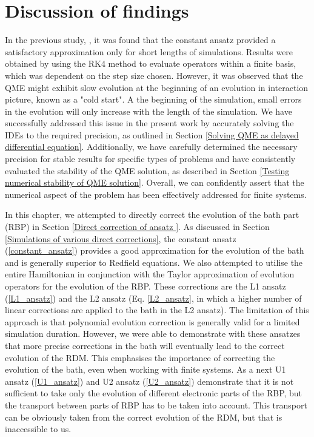 \section{Discussion of findings}
In the previous study, \cite{herman_elektron-fononova_2020}, it was found that the constant ansatz provided a satisfactory approximation only for short lengths of simulations. Results were obtained by using the RK4 method to evaluate operators within a finite basis, which was dependent on the step size chosen. However, it was observed that the QME might exhibit slow evolution at the beginning of an evolution in interaction picture, known as a "cold start". A the beginning of the simulation, small errors in the evolution will only increase with the length of the simulation. We have successfully addressed this issue in the present work by accurately solving the IDEs to the required precision, as outlined in Section \ref{Solving QME as delayed differential equation}. Additionally, we have carefully determined the necessary precision for stable results for specific types of problems and have consistently evaluated the stability of the QME solution, as described in Section \ref{Testing numerical stability of QME solution}. Overall, we can confidently assert that the numerical aspect of the problem has been effectively addressed for finite systems.
 
In this chapter, we attempted to directly correct the evolution of the bath part (RBP) in Section \ref{Direct correction of ansatz }. As discussed in Section \ref{Simulations of various direct corrections}, the constant ansatz (\ref{constant_ansatz}) provides a good approximation for the evolution of the bath and is generally superior to Redfield equations. We also attempted to utilise the entire Hamiltonian in conjunction with the Taylor approximation of evolution operators for the evolution of the RBP. These corrections are the L1 ansatz (\ref{L1_ansatz}) and the L2 ansatz (Eq. \ref{L2_ansatz}, in which a higher number of linear corrections are applied to the bath in the L2 ansatz). The limitation of this approach is that polynomial evolution correction is generally valid for a limited simulation duration. However, we were able to demonstrate with these ansatzes that more precise corrections in the bath will eventually lead to the correct evolution of the RDM. This emphasises the importance of correcting the evolution of the bath, even when working with finite systems. As a next U1 ansatz (\ref{U1_ansatz}) and U2 ansatz (\ref{U2_ansatz}) demonstrate that it is not sufficient to take only the evolution of different electronic parts of the RBP, but the transport between parts of RBP has to be taken into account. This transport can be obviously taken from the correct evolution of the RDM, but that is inaccessible to us. 


